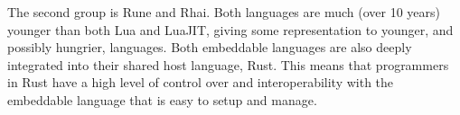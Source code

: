 The second group is Rune\cite{rune} and Rhai\cite{rhai}. Both languages are much (over 10 years) younger than both Lua and LuaJIT, giving some representation to younger, and possibly hungrier, languages. Both embeddable languages are also deeply integrated into their shared host language, Rust. This means that programmers in Rust have a high level of control over and interoperability with the embeddable language that is easy to setup and manage.
